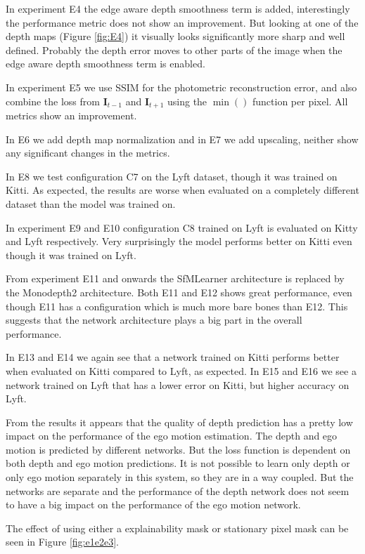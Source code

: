 In experiment E4 the edge aware depth smoothness term is added, interestingly the performance metric does not show an improvement. But looking at one of the depth maps (Figure \ref{fig:E4}) it visually looks significantly more sharp and well defined. Probably the depth error moves to other parts of the image when the edge aware depth smoothness term is enabled.

In experiment E5 we use SSIM for the photometric reconstruction error, and also combine the loss from $\textbf{I}_{t-1}$ and $\textbf{I}_{t+1}$ using the $\min()$ function per pixel. All metrics show an improvement.

In E6 we add depth map normalization and in E7 we add upscaling, neither show any significant changes in the metrics.

In E8 we test configuration C7 on the Lyft dataset, though it was trained on Kitti. As expected, the results are worse when evaluated on a completely different dataset than the model was trained on.

In experiment E9 and E10 configuration C8 trained on Lyft is evaluated on Kitty and Lyft respectively. Very surprisingly the model performs better on Kitti even though it was trained on Lyft.

From experiment E11 and onwards the SfMLearner architecture is replaced by the Monodepth2 architecture. Both E11 and E12 shows great performance, even though E11 has a configuration which is much more bare bones than E12. This suggests that the network architecture plays a big part in the overall performance.

In E13 and E14 we again see that a network trained on Kitti performs better when evaluated on Kitti compared to Lyft, as expected. In E15 and E16 we see a network trained on Lyft that has a lower error on Kitti, but higher accuracy on Lyft.

From the results it appears that the quality of depth prediction has a pretty low impact on the performance of the ego motion estimation. The depth and ego motion is predicted by different networks. But the loss function is dependent on both depth and ego motion predictions. It is not possible to learn only depth or only ego motion separately in this system, so they are in a way coupled. But the networks are separate and the performance of the depth network does not seem to have a big impact on the performance of the ego motion network.

The effect of using either a explainability mask or stationary pixel mask can be seen in Figure \ref{fig:e1e2e3}.

